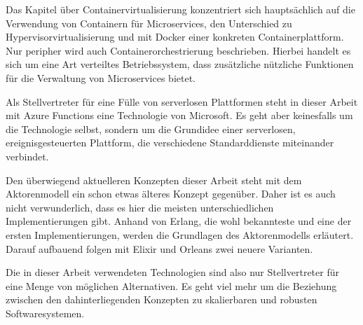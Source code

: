 Das Kapitel über Containervirtualisierung konzentriert sich hauptsächlich auf die Verwendung von Containern für Microservices, den Unterschied zu Hypervisorvirtualisierung und mit Docker einer konkreten Containerplattform. Nur peripher wird auch Containerorchestrierung beschrieben. Hierbei handelt es sich um eine Art verteiltes Betriebssystem, dass zusätzliche nützliche Funktionen für die Verwaltung von Microservices bietet.

Als Stellvertreter für eine Fülle von serverlosen Plattformen steht in dieser Arbeit mit Azure Functions eine Technologie von Microsoft. Es geht aber keinesfalls um die Technologie selbst, sondern um die Grundidee einer serverlosen, ereignisgesteuerten Plattform, die verschiedene Standarddienste miteinander verbindet.

Den überwiegend aktuelleren Konzepten dieser Arbeit steht mit dem Aktorenmodell ein schon etwas älteres Konzept gegenüber. Daher ist es auch nicht verwunderlich, dass es hier die meisten unterschiedlichen Implementierungen gibt. Anhand von Erlang, die wohl bekannteste und eine der ersten Implementierungen, werden die Grundlagen des Aktorenmodells erläutert. Darauf aufbauend folgen mit Elixir und Orleans zwei neuere Varianten.

Die in dieser Arbeit verwendeten Technologien sind also nur Stellvertreter für eine Menge von möglichen Alternativen. Es geht viel mehr um die Beziehung zwischen den dahinterliegenden Konzepten zu skalierbaren und robusten Softwaresystemen.